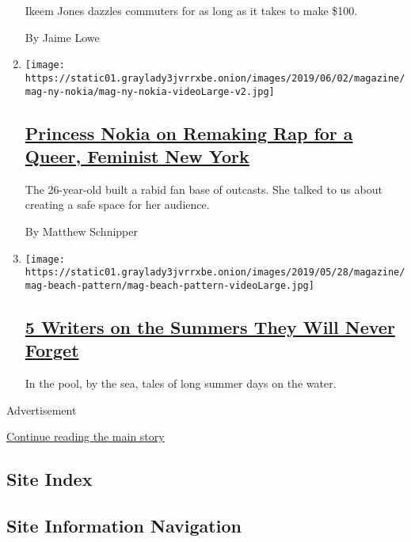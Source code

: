 \begin{enumerate}
  Ikeem Jones dazzles commuters for as long as it takes to make \$100.

  By Jaime Lowe
\item
  \texttt{[image: https://static01.graylady3jvrrxbe.onion/images/2019/06/02/magazine/mag-ny-nokia/mag-ny-nokia-videoLarge-v2.jpg]}

  \hypertarget{princess-nokia-on-remaking-rap-for-a-queer-feminist-new-york}{%
  \subsection{\texorpdfstring{\href{/interactive/2019/05/30/magazine/princess-nokia-new-york.html}{Princess
  Nokia on Remaking Rap for a Queer, Feminist New
  York}}{Princess Nokia on Remaking Rap for a Queer, Feminist New York}}\label{princess-nokia-on-remaking-rap-for-a-queer-feminist-new-york}}

  The 26-year-old built a rabid fan base of outcasts. She talked to us
  about creating a safe space for her audience.

  By Matthew Schnipper
\item
  \texttt{[image: https://static01.graylady3jvrrxbe.onion/images/2019/05/28/magazine/mag-beach-pattern/mag-beach-pattern-videoLarge.jpg]}

  \hypertarget{5-writers-on-the-summers-they-will-never-forget}{%
  \subsection{\texorpdfstring{\href{/2019/06/01/magazine/5-writers-on-the-summers-they-will-never-forget.html}{5
  Writers on the Summers They Will Never
  Forget}}{5 Writers on the Summers They Will Never Forget}}\label{5-writers-on-the-summers-they-will-never-forget}}

  In the pool, by the sea, tales of long summer days on the water.
\end{enumerate}

Advertisement

\protect\hyperlink{after-mid1}{Continue reading the main story}

\hypertarget{site-index}{%
\subsection{Site Index}\label{site-index}}

\hypertarget{site-information-navigation}{%
\subsection{Site Information
Navigation}\label{site-information-navigation}}

